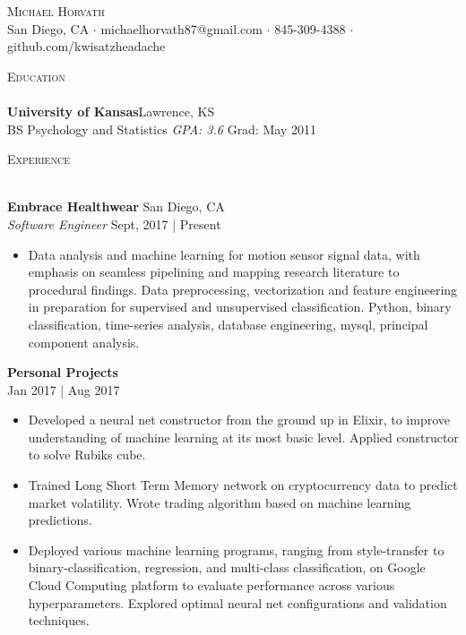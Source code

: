 \documentclass[a4paper]{article}
\newcommand{\lineunder} {
    \vspace*{-8pt} \\
    \hspace*{-18pt} \hrulefill \\
}
\newcommand{\header} [1] {
    {\hspace*{-18pt}\vspace*{6pt} \textsc{#1}}
    \vspace*{-6pt} \lineunder
}
\begin{document}
\vspace*{-40pt}

\vspace*{-10pt}
\begin{center}
	{\Huge \scshape {Michael Horvath}}\\
	San Diego, CA $\cdot$ michaelhorvath87@gmail.com $\cdot$ 845-309-4388 $\cdot$ github.com/kwisatzheadache\\
\end{center}

\vspace*{2mm}

\header{Education}
\textbf{University of Kansas}\hfill Lawrence, KS\\
BS Psychology and Statistics \textit{GPA: 3.6} \hfill Grad: May 2011\\
\vspace{2mm}

\vspace*{2mm}

\header{Experience}
\vspace{1mm}

\textbf{Embrace Healthwear} \hfill San Diego, CA\\
\textit{Software Engineer} \hfill Sept, 2017 | Present\\
\vspace{-1mm}
\begin{itemize} \itemsep 1pt
	\item Data analysis and machine learning for motion sensor signal data, with emphasis on seamless pipelining and mapping research literature to procedural findings. Data preprocessing, vectorization and feature engineering in preparation for supervised and unsupervised classification. Python, binary classification, time-series analysis, database engineering, mysql, principal component analysis.
\end{itemize}

\textbf{Personal Projects}\\
\hfill Jan 2017 | Aug 2017\\
\vspace{-1mm}
\begin{itemize} \itemsep 1pt
	\item Developed a neural net constructor from the ground up in Elixir, to improve understanding of machine learning at its most basic level. Applied constructor to solve Rubiks cube.
	\item Trained Long Short Term Memory network on cryptocurrency data to predict market volatility. Wrote trading algorithm based on machine learning predictions.
	\item Deployed various machine learning programs, ranging from style-transfer to binary-classification, regression, and multi-class classification, on Google Cloud Computing platform to evaluate performance across various hyperparameters. Explored optimal neural net configurations and validation techniques.
\end{itemize}
\end{document}
